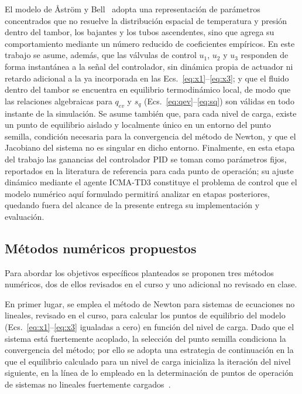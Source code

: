 \documentclass[final,5p,times,twocolumn,authoryear,11pt]{elsarticle}
\begin{document}
El modelo de Åström y Bell~\citep{astrom2000drum} adopta una representación de parámetros concentrados que no resuelve la distribución espacial de temperatura y presión dentro del tambor, los bajantes y los tubos ascendentes, sino que agrega su comportamiento mediante un número reducido de coeficientes empíricos. En este trabajo se asume, además, que las válvulas de control $u_1$, $u_2$ y $u_3$ responden de forma instantánea a la señal del controlador, sin dinámica propia de actuador ni retardo adicional a la ya incorporada en las Ecs.~\eqref{eq:x1}--\eqref{eq:x3}; y que el fluido dentro del tambor se encuentra en equilibrio termodinámico local, de modo que las relaciones algebraicas para $q_{ev}$ y $s_q$ (Ecs.~\eqref{eq:qev}--\eqref{eq:sq}) son válidas en todo instante de la simulación. Se asume también que, para cada nivel de carga, existe un punto de equilibrio aislado y localmente único en un entorno del punto semilla, condición necesaria para la convergencia del método de Newton, y que el Jacobiano del sistema no es singular en dicho entorno. Finalmente, en esta etapa del trabajo las ganancias del controlador PID se toman como parámetros fijos, reportados en la literatura de referencia para cada punto de operación; su ajuste dinámico mediante el agente ICMA-TD3 constituye el problema de control que el modelo numérico aquí formulado permitirá analizar en etapas posteriores, quedando fuera del alcance de la presente entrega su implementación y evaluación.

\subsection{Métodos numéricos propuestos}

Para abordar los objetivos específicos planteados se proponen tres métodos numéricos, dos de ellos revisados en el curso y uno adicional no revisado en clase.

En primer lugar, se emplea el método de Newton para sistemas de ecuaciones no lineales, revisado en el curso, para calcular los puntos de equilibrio del modelo (Ecs.~\eqref{eq:x1}--\eqref{eq:x3} igualadas a cero) en función del nivel de carga. Dado que el sistema está fuertemente acoplado, la selección del punto semilla condiciona la convergencia del método; por ello se adopta una estrategia de continuación en la que el equilibrio calculado para un nivel de carga inicializa la iteración del nivel siguiente, en la línea de lo empleado en la determinación de puntos de operación de sistemas no lineales fuertemente cargados~\citep{ajjarapu1992continuation}.
\end{document}
